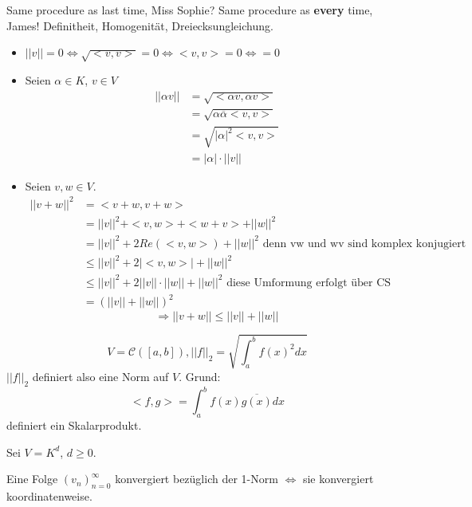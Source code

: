 \documentclass[main.tex]{subfiles}
\begin{document}
\begin{Beweis}
  Same procedure as last time, Miss Sophie? Same procedure as \textbf{every} time, James! Definitheit, Homogenität, Dreiecksungleichung.
  \begin{itemize}
    \item $||v|| = 0 \Leftrightarrow \sqrt{<v,v>} = 0 \Leftrightarrow <v,v> = 0 \Leftrightarrow = 0$
    \item Seien $\alpha \in K$, $v \in V$
      $$\begin{aligned}
        ||\alpha v || &= \sqrt{<\alpha v, \alpha v>}\\
        &= \sqrt{\alpha\overline{\alpha} <v,v> }\\
        &= \sqrt{|\alpha|^2 <v,v> }\\
        &= |\alpha| \cdot ||v||
      \end{aligned}$$
    \item Seien $v,w \in V$.
      $$\begin{aligned}
        ||v + w||^2 &= <v+w ,v+w>\\
        &= ||v||^2 + <v,w> + <w+v> + ||w||^2\\
        &= ||v||^2 + 2 Re(<v,w>) + ||w||^2 \text{ denn vw und wv sind komplex konjugiert}\\
        &\leq ||v||^2 + 2 |<v,w>| + ||w||^2\\
        &\leq ||v||^2 + 2 ||v||\cdot||w|| + ||w||^2 \text{ diese Umformung erfolgt über CS}\\
        &= (||v||+||w||)^2
      \end{aligned}$$
      $$\Rightarrow ||v+w|| \leq ||v|| + ||w||$$
  \end{itemize}
\end{Beweis}

\begin{Beispiel}[Anwendung]
  $$V = \mathcal{C}([a,b]), ||f||_2 = \sqrt{\int_a^b f(x)^2 dx}$$
  $||f||_2$ definiert also eine Norm auf $V$. Grund:
  $$<f,g> = \int_a^b f(x)\overline{g(x)} dx$$
  definiert ein Skalarprodukt.
\end{Beispiel}

\begin{Theorem}
  Sei $V = K^d$, $d \geq 0$.

  Eine Folge $(v_n)_{n=0}^\infty$ konvergiert bezüglich der 1-Norm $\Leftrightarrow$ sie konvergiert koordinatenweise.
\end{Theorem}
\end{document}
